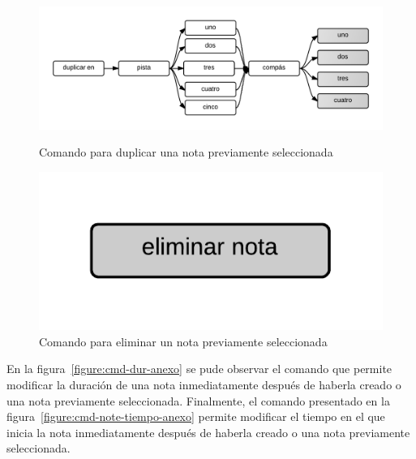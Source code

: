 \begin{figure}[H]
\begin{minipage}[b]{0.5\linewidth}
\centering
\includegraphics[width=1.2\linewidth]{./graphics/cmd-dup-nota.png}
\caption{Comando para duplicar una nota previamente seleccionada}
\label{figure:cmd-dup-nota-anexo}
\end{minipage}
\quad
\begin{minipage}[b]{0.5\linewidth}
\centering
\includegraphics[width=0.5\linewidth]{./graphics/del-note.png}
\caption{Comando para eliminar un nota previamente seleccionada}
\label{figure:cmd-del-nota-anexo}
\end{minipage}
\end{figure}

En la figura~\ref{figure:cmd-dur-anexo} se pude observar el comando que permite modificar la duraci\'on de 
una nota inmediatamente despu\'es de haberla creado o una nota previamente seleccionada. Finalmente, el comando
presentado en la figura~\ref{figure:cmd-note-tiempo-anexo} permite modificar el tiempo en el que inicia la 
nota inmediatamente despu\'es de haberla creado o una nota previamente seleccionada.

